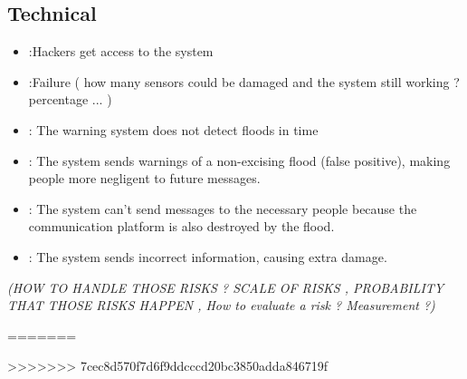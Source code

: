 \subsection{Technical}
\begin{itemize}
\item {}:Hackers get access to the system \\
\item {}:Failure ( how many sensors could be damaged and the system still working ? percentage ... ) \\ 

	\item {}: The warning system does not detect floods in time
	\item {}: The system sends warnings of a non-excising flood (false positive), making people more negligent to future messages.
	\item {}: The system can't send messages to the necessary people because the communication platform is also destroyed by the flood.
	\item {}: The system sends incorrect information, causing extra damage.
\end{itemize}


\textit{(HOW TO HANDLE THOSE RISKS ? SCALE OF RISKS , PROBABILITY THAT THOSE RISKS HAPPEN , How to evaluate a risk ? Measurement ?)}



=======



>>>>>>> 7cec8d570f7d6f9ddcccd20bc3850adda846719f
